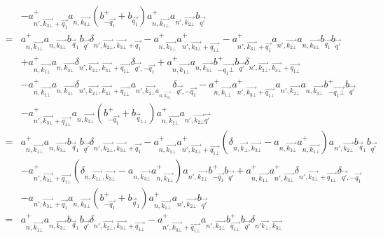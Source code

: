 \documentclass{article}
\begin{document}
\begin{align*}
    &  - a^+_{n', \vec{k_{3\bot}} + \vec{q_1}}a_{n, \vec{k_{3\bot}}} \left(b^+_{-\vec{q_1}}+b_{\vec{q_1}}\right) a^+_{n,
    \vec{k_{1\bot}}}a_{n', \vec{k_{2\bot}}}b_{\vec{q'}}\\
    = & a^+_{n, \vec{k_{1\bot}}}a_{n, \vec{k_{3\bot}}} b_{\vec{q}_1} b_{\vec{q'}} \delta_{n', \vec{k_{2\bot}}, \vec{k_{3\bot}} + \vec{q_1}}- a^+_{n, \vec{k_{1\bot}}}a^+_{n', \vec{k_{3\bot}}+ \vec{q_{1\bot}}}- a^+_{n', \vec{k_{3\bot}}+\vec{q_1}}a_{n',\vec{k_{2\bot}}}a_{n, \vec{k_{3\bot}}}b_{\vec{q_1}}b_{\vec{q'}} \\
    & + a^+_{n, \vec{k_{1\bot}}}a_{n, \vec{k_{3\bot}}} \delta_{n', \vec{k_{2\bot}}, \vec{k_{3\bot}} + \vec{q_{1\bot}}}\delta_{\vec{q'}, - \vec{q_1}}+ a^+_{n, \vec{k_{1\bot}}} a_{n, \vec{k_{3\bot}}} b^+_{- \vec{q_1\bot}}b_{\vec{q'}} \delta_{n', \vec{k_{2\bot}}, \vec{k_{3\bot}} + \vec{q_{1\bot}}}\\
    & - a^+_{n, \vec{k_{1\bot}}}a_{n,\vec{k_{3\bot}}} \delta_{n', \vec{k_{2\bot}}, \vec{k_{3\bot}} + \vec{q_{1\bot}}}a_{n',\vec{k_{2\bot}} a_{n, \vec{k_{3\bot}}}}\delta_{\vec{q'},-\vec{q_1}}-a^+_{n, \vec{k_{1\bot}}} a^+_{n', \vec{k_{3\bot}} + \vec{q_{1\bot}}}a_{n', \vec{k_{2\bot}}} a_{n, \vec{k_{3\bot}}}b^+_{-\vec{q_1\bot}} b_{\vec{q'}} \\
     & - a^+_{n', \vec{k_{3\bot}} + \vec{q_{1\bot}}}a_{n, \vec{k_{3\bot}}} \left(b^+_{- \vec{q_1}}+ b_{\vec{q}_{1\bot}}\right) a^+_{n, \vec{k_{1\bot}}} a_{n',\vec{k_{2\bot}}\vec{q'}}\\
    = & a^+_{n, \vec{k_{1\bot}}}a_{n, \vec{k_{3\bot}}} b_{\vec{q}_{1}} b_{\vec{q'}} \delta_{n', \vec{k_{2\bot}}, \vec{k_{3\bot}} + \vec{q_1}}- a^+_{n, \vec{k_{1\bot}}}a^+_{n', \vec{k_{3\bot}} + \vec{q_{1\bot}}} \left(\delta_{n , \vec{k_\bot}, \vec{k_{3\bot}}}- a_{n,\vec{k_{3\bot}}} a^+_{n, \vec{k_{1\bot}}}\right)a_{n', \vec{k_{2\bot}}} b_{\vec{q}_{1}} b_{\vec{q'}} \\
     & - a^+_{n', \vec{k_{3\bot}} + \vec{q_{1\bot}}}\left(\delta_{n, \vec{k_{1\bot}}, \vec{k_{3\bot}}}- a_{n,\vec{k_{3\bot}}}a^+_{n, \vec{k_{1\bot}}}\right)a_{n', \vec{k_{2\bot}}} b^+_{-\vec{q_1}} b_{\vec{q'}} + a^+_{n, \vec{k_{1\bot}}} a^+_{n',\vec{k_{3\bot}}}\delta_{n', \vec{k_{3\bot}} + \vec{q_{1\bot}}}\delta_{\vec{q'}, -\vec{q_1}}\\
    & - a_{n', \vec{k_{3\bot}} + \vec{q_1}}a_{n, \vec{k_{3\bot}}} \left(b^+_{-\vec{q_1}}+ b_{\vec{q}_{1}}\right) a^+_{n,\vec{k_{1\bot}}} a_{n', \vec{k_{2\bot}}} b_{\vec{q'}}\\
    = & a^+_{n, \vec{k_{1\bot}}} a_{n, \vec{k_{3\bot}}} b_{\vec{q}_{1}} b_{\vec{q'}} \delta_{n', \vec{k_{2\bot}},\vec{k_{3\bot}} +\vec{q_{1 \bot}}}- a^+_{n', \vec{k_{3 \bot}} + \vec{q_{1\bot}}}a_{n', \vec{k_{2\bot}}} b^+_{\vec{q_{1\bot}}} b_{\vec{q'}} \delta_{n' \vec{k_\bot}, \vec{k_{3\bot}}} \\ 

\end{align*}
\end{document}
